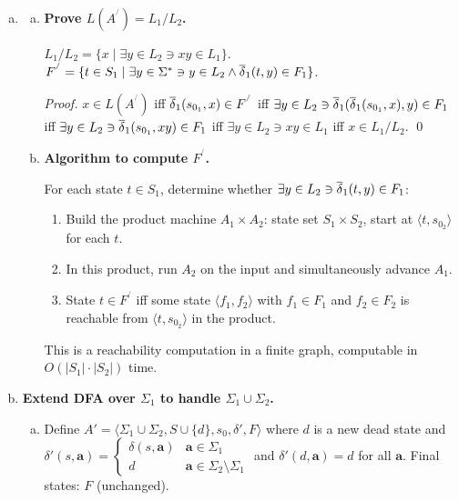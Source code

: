 \begin{enumerate}[{5.}1. ]
\begin{enumerate}[(a)]
Define $\psi:\text{ASCII}^*\to\text{ASCII}^*$ by
$\psi(c)=\begin{cases}\text{uppercase}(c) & \text{if }c\in\{a,\ldots,z\} \\ c & \text{otherwise}\end{cases}$
(extended letter-by-letter to words).  This is a homomorphism since $\psi(xy)=\psi(x)\psi(y)$ follows from the letter-by-letter definition.

\item \begin{enumerate}[(a)]
  \item \textbf{Prove $L(A^{^/})=L_1/L_2$.}

  $L_1/L_2=\{x\mid\exists y\in L_2\ni xy\in L_1\}$.
  $F^{^/}=\{t\in S_1\mid\exists y\in\Sigma^*\ni y\in L_2\wedge\overline{\delta}_1(t,y)\in F_1\}$.

  \begin{proof}
  $x\in L(A^{^/})$ iff $\overline{\delta}_1(s_{0_1},x)\in F^{^/}$
  iff $\exists y\in L_2\ni\overline{\delta}_1(\overline{\delta}_1(s_{0_1},x),y)\in F_1$
  iff $\exists y\in L_2\ni\overline{\delta}_1(s_{0_1},xy)\in F_1$
  iff $\exists y\in L_2\ni xy\in L_1$
  iff $x\in L_1/L_2$. \qed
  \end{proof}

  \item \textbf{Algorithm to compute $F^{^/}$.}

  For each state $t\in S_1$, determine whether $\exists y\in L_2\ni\overline{\delta}_1(t,y)\in F_1$:
  \begin{enumerate}[1.]
    \item Build the product machine $A_1\times A_2$: state set $S_1\times S_2$, start at $\langle t,s_{0_2}\rangle$ for each $t$.
    \item In this product, run $A_2$ on the input and simultaneously advance $A_1$.
    \item State $t\in F^{^/}$ iff some state $\langle f_1,f_2\rangle$ with $f_1\in F_1$ and $f_2\in F_2$ is reachable from $\langle t,s_{0_2}\rangle$ in the product.
  \end{enumerate}
  This is a reachability computation in a finite graph, computable in $O(|S_1|\cdot|S_2|)$ time.
\end{enumerate}

\item \textbf{Extend DFA over $\Sigma_1$ to handle $\Sigma_1\cup\Sigma_2$.}

\begin{enumerate}[(a)]
  \item Define $A'=\langle\Sigma_1\cup\Sigma_2,S\cup\{d\},s_0,\delta',F\rangle$ where $d$ is a new dead state and
  $\delta'(s,\pmb{a})=\begin{cases}\delta(s,\pmb{a}) & \pmb{a}\in\Sigma_1 \\ d & \pmb{a}\in\Sigma_2\setminus\Sigma_1\end{cases}$
  and $\delta'(d,\pmb{a})=d$ for all $\pmb{a}$.  Final states: $F$ (unchanged).


\end{enumerate}
\end{enumerate}
\end{enumerate}
